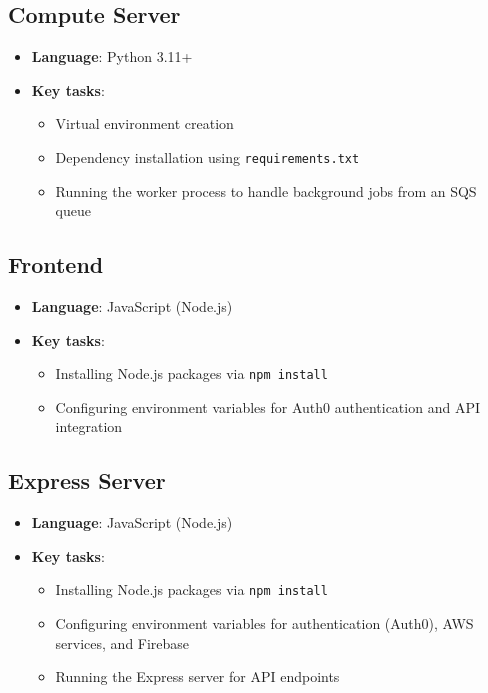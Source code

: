 \documentclass{article}
\begin{document}
\subsection{Compute Server}
\begin{itemize}
    \item \textbf{Language}: Python 3.11+
    \item \textbf{Key tasks}:
    \begin{itemize}
        \item Virtual environment creation
        \item Dependency installation using \texttt{requirements.txt}
        \item Running the worker process to handle background jobs from an SQS queue
    \end{itemize}
\end{itemize}

\subsection{Frontend}
\begin{itemize}
    \item \textbf{Language}: JavaScript (Node.js)
    \item \textbf{Key tasks}:
    \begin{itemize}
        \item Installing Node.js packages via \texttt{npm install}
        \item Configuring environment variables for Auth0 authentication and API integration
    \end{itemize}
\end{itemize}

\subsection{Express Server}
\begin{itemize}
    \item \textbf{Language}: JavaScript (Node.js)
    \item \textbf{Key tasks}:
    \begin{itemize}
        \item Installing Node.js packages via \texttt{npm install}
        \item Configuring environment variables for authentication (Auth0), AWS services, and Firebase
        \item Running the Express server for API endpoints
    \end{itemize}
\end{itemize}
\end{document}
